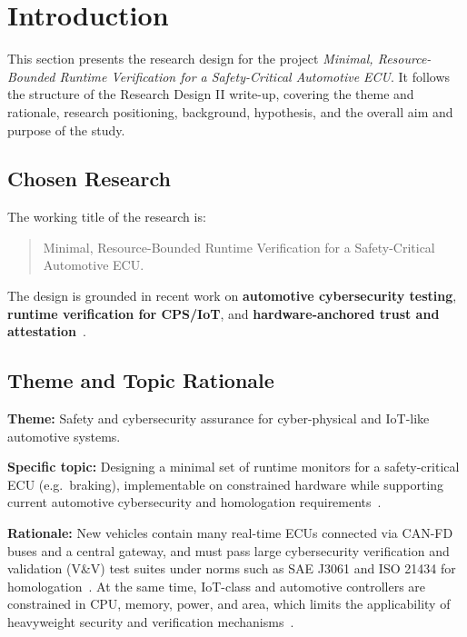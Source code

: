 \section{Introduction}
\label{sec:Int}

This section presents the research design for the project \emph{Minimal, Resource-Bounded Runtime Verification for a Safety-Critical Automotive ECU}. It follows the structure of the Research Design II write-up, covering the theme and rationale, research positioning, background, hypothesis, and the overall aim and purpose of the study.

\subsection{Chosen Research}

The working title of the research is:

\begin{quote}
Minimal, Resource-Bounded Runtime Verification for a Safety-Critical Automotive ECU.
\end{quote}

The design is grounded in recent work on \textbf{automotive cybersecurity testing}, \textbf{runtime verification for CPS/IoT}, and \textbf{hardware-anchored trust and attestation}~\cite{ekert2021cybersecurity,zhang2024context,dehoz2022iotdt,plappert2023hta}.

\subsection{Theme and Topic Rationale}

\textbf{Theme:} Safety and cybersecurity assurance for cyber-physical and IoT-like automotive systems.

\textbf{Specific topic:} Designing a minimal set of runtime monitors for a safety-critical ECU (e.g.\ braking), implementable on constrained hardware while supporting current automotive cybersecurity and homologation requirements~\cite{ekert2021cybersecurity,krichen2023survey}.

\textbf{Rationale:} New vehicles contain many real-time ECUs connected via CAN-FD buses and a central gateway, and must pass large cybersecurity verification and validation (V\&V) test suites under norms such as SAE J3061 and ISO 21434 for homologation~\cite{ekert2021cybersecurity}. At the same time, IoT-class and automotive controllers are constrained in CPU, memory, power, and area, which limits the applicability of heavyweight security and verification mechanisms~\cite{williams2022survey,saadat2024rosmonitoring2}.

